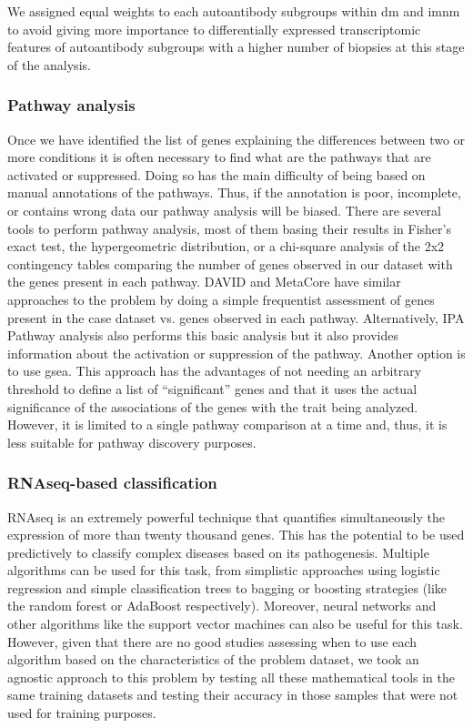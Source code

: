 We assigned equal weights to each autoantibody subgroups within \gls{dm} and  \gls{imnm} to avoid giving more importance to differentially expressed transcriptomic features of autoantibody subgroups with a higher number of biopsies at this stage of the analysis.

\subsubsection{Pathway analysis}
Once we have identified the list of genes explaining the differences between two or more conditions it is often necessary to find what are the pathways that are activated or suppressed. Doing so has the main difficulty of being based on manual annotations of the pathways. Thus, if the annotation is poor, incomplete, or contains wrong data our pathway analysis will be biased. There are several tools to perform pathway analysis, most of them basing their results in Fisher’s exact test, the hypergeometric distribution, or a chi-square analysis of the 2x2 contingency tables comparing the number of genes observed in our dataset with the genes present in each pathway. DAVID and MetaCore have similar approaches to the problem by doing a simple frequentist assessment of genes present in the case dataset vs. genes observed in each pathway. Alternatively, IPA Pathway analysis also performs this basic analysis but it also provides information about the activation or suppression of the pathway. Another option is to use \gls{gsea}. This approach has the advantages of not needing an arbitrary threshold to define a list of “significant” genes and that it uses the actual significance of the associations of the genes with the trait being analyzed. However, it is limited to a single pathway comparison at a time and, thus, it is less suitable for pathway discovery purposes.

\subsubsection{RNAseq-based classification}
RNAseq is an extremely powerful technique that quantifies simultaneously the expression of more than twenty thousand genes. This has the potential to be used predictively to classify complex diseases based on its pathogenesis. Multiple algorithms can be used for this task, from simplistic approaches using logistic regression and simple classification trees to bagging or boosting strategies (like the random forest or AdaBoost respectively). Moreover, neural networks and other algorithms like the support vector machines can also be useful for this task. However, given that there are no good studies assessing when to use each algorithm based on the characteristics of the problem dataset, we took an agnostic approach to this problem by testing all these mathematical tools in the same training datasets and testing their accuracy in those samples that were not used for training purposes.

